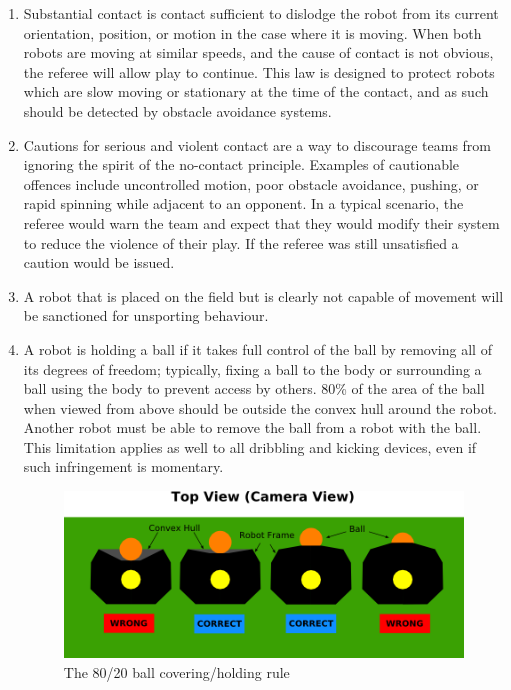 \begin{enumerate}
\item
Substantial contact is contact sufficient to dislodge the robot from its current orientation, position, or motion in the case where it is moving.
When both robots are moving at similar speeds, and the cause of contact is not obvious, the referee will allow play to continue.
This law is designed to protect robots which are slow moving or stationary at the time of the contact, and as such should be detected by obstacle avoidance systems.

\item
Cautions for serious and violent contact are a way to discourage teams from ignoring the spirit of the no-contact principle.
Examples of cautionable offences include uncontrolled motion, poor obstacle avoidance, pushing, or rapid spinning while adjacent to an opponent.
In a typical scenario, the referee would warn the team and expect that they would modify their system to reduce the violence of their play.
If the referee was still unsatisfied a caution would be issued.

\item
A robot that is placed on the field but is clearly not capable of movement will be sanctioned for unsporting behaviour.

\item
A robot is holding a ball if it takes full control of the ball by removing all of its degrees of freedom; typically, fixing a ball to the body or surrounding a ball using the body to prevent access by others.
80\% of the area of the ball when viewed from above should be outside the convex hull around the robot.
Another robot must be able to remove the ball from a robot with the ball.
This limitation applies as well to all dribbling and kicking devices, even if such infringement is momentary.

\begin{figure}[ht] %
	\centering
	\includegraphics[width=1.0\columnwidth]{img/dribblers_above_view.png}
	\caption{The 80/20 ball covering/holding rule}
	\label{fig:20-rule}
\end{figure}


\end{enumerate}
